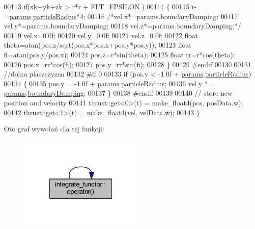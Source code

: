 \begin{DoxyCode}
00113                 \textcolor{keywordflow}{if}(xk+yk+zk > r*r + FLT\_EPSILON )
00114                 \{
00115                         r-=\hyperlink{particles__kernel__impl_8cuh_a8db8938e28edd17862daf58651051bdc}{params}.\hyperlink{struct_sim_params_a7e131c24e1020c44173deb0f57a8c4af}{particleRadius}*4;
00116                         \textcolor{comment}{/*vel.x*=params.boundaryDamping;}
00117 \textcolor{comment}{                        vel.y*=params.boundaryDamping;}
00118 \textcolor{comment}{                        vel.z*=params.boundaryDamping;*/}
00119                         vel.x=0.0f;
00120                         vel.y=0.0f;
00121                         vel.z=0.0f;
00122                         \textcolor{keywordtype}{float} theta=atan(pos.z/sqrt(pos.x*pos.x+pos.y*pos.y));
00123                         \textcolor{keywordtype}{float} fi=atan(pos.y/pos.x);
00124                         pos.z=r*sin(theta);
00125                         \textcolor{keywordtype}{float} rr=r*cos(theta);
00126                         pos.x=rr*cos(fi);
00127                         pos.y=rr*sin(fi);
00128                 \}
00129 \textcolor{preprocessor}{#endif}
00130 \textcolor{preprocessor}{}
00131 \textcolor{comment}{//dolna plaszczyzna}
00132 \textcolor{preprocessor}{#if 0}
00133 \textcolor{preprocessor}{}        \textcolor{keywordflow}{if} (pos.y < -1.0f + \hyperlink{particles__kernel__impl_8cuh_a8db8938e28edd17862daf58651051bdc}{params}.\hyperlink{struct_sim_params_a7e131c24e1020c44173deb0f57a8c4af}{particleRadius})
00134         \{
00135             pos.y = -1.0f + \hyperlink{particles__kernel__impl_8cuh_a8db8938e28edd17862daf58651051bdc}{params}.\hyperlink{struct_sim_params_a7e131c24e1020c44173deb0f57a8c4af}{particleRadius};
00136             vel.y *= \hyperlink{particles__kernel__impl_8cuh_a8db8938e28edd17862daf58651051bdc}{params}.\hyperlink{struct_sim_params_a4da0c7593d6569e48ee50e7d0c7576f9}{boundaryDamping};
00137         \}
00138 \textcolor{preprocessor}{#endif}
00139 \textcolor{preprocessor}{}
00140         \textcolor{comment}{// store new position and velocity}
00141         thrust::get<0>(t) = make\_float4(pos, posData.w);
00142         thrust::get<1>(t) = make\_float4(vel, velData.w);
00143     \}
\end{DoxyCode}


Oto graf wywołań dla tej funkcji\-:\nopagebreak
\begin{figure}[H]
\begin{center}
\leavevmode
\includegraphics[width=175pt]{structintegrate__functor_a772e86ead8690332beb50911e4448f81_cgraph}
\end{center}
\end{figure}




